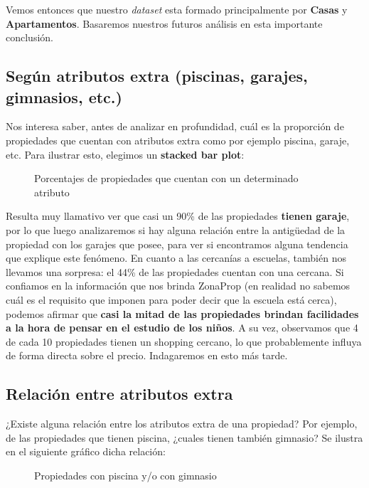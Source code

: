 \documentclass[
10pt, %
a4paper, %
oneside, %
headinclude,footinclude, %
BCOR5mm, %
]{scrartcl}
\begin{document}
    Vemos entonces que nuestro \textit{dataset} esta formado principalmente por \textbf{Casas} y \textbf{Apartamentos}. Basaremos nuestros futuros an\'alisis en esta importante conclusi\'on.
    
    \subsection{Seg\'un atributos extra (piscinas, garajes, gimnasios, etc.)}
    Nos interesa saber, antes de analizar en profundidad, cu\'al es la proporci\'on de propiedades que cuentan con atributos extra como por ejemplo piscina, garaje, etc. Para ilustrar esto, elegimos un \textbf{stacked bar plot}:
    
    \begin{figure}[H]
        \caption{Porcentajes de propiedades que cuentan con un determinado atributo}
        \label{fig:distribucion-atributos}
    \end{figure}
    
    Resulta muy llamativo ver que casi un 90\% de las propiedades \textbf{tienen garaje}, por lo que luego analizaremos si hay alguna relaci\'on entre la antigüedad de la propiedad con los garajes que posee, para ver si encontramos alguna tendencia que explique este fen\'omeno. 
    \vskip 2mm
    En cuanto a las cercan\'ias a escuelas, tambi\'en nos llevamos una sorpresa: el 44\% de las propiedades cuentan con una cercana. Si confiamos en la informaci\'on que nos brinda ZonaProp (en realidad no sabemos cu\'al es el requisito que imponen para poder decir que la escuela est\'a cerca), podemos afirmar que \textbf{casi la mitad de las propiedades brindan facilidades a la hora de pensar en el estudio de los niños}.
    \vskip 2mm
    A su vez, observamos que 4 de cada 10 propiedades tienen un shopping cercano, lo que probablemente influya de forma directa sobre el precio. Indagaremos en esto m\'as tarde.
    
    \subsection{Relaci\'on entre atributos extra}
    ¿Existe alguna relación entre los atributos extra de una propiedad? Por ejemplo, de las propiedades que tienen piscina, ¿cuales tienen también gimnasio? Se ilustra en el siguiente gráfico dicha relación:
    
    \begin{figure}[H]
        \caption{Propiedades con piscina y/o con gimnasio}
        \label{fig:distribucion-piscina-gimnasio}
    \end{figure}
    
\end{document}
